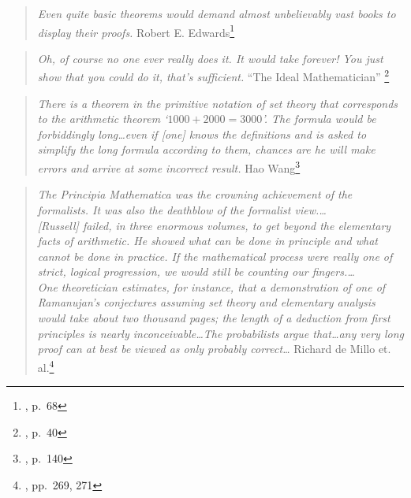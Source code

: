 \begin{quote}
  {\em Even quite basic theorems would demand almost unbelievably vast
  books to display their proofs.}
    \flushright\sc  Robert E. Edwards\footnote{\cite{Edwards}, p.~68}\\
\end{quote}

\begin{quote}
  {\em Oh, of course no one ever really {\em does} it.  It would take
  forever!  You just show that you could do it, that's sufficient.}
    \flushright\sc  ``The Ideal Mathematician''
    \footnote{\cite{Davis},
p.~40}\\
\end{quote}

\begin{quote}
  {\em There is a theorem in the primitive notation of set theory that
  corresponds to the arithmetic theorem `$1000+2000=3000$'.  The formula
  would be forbiddingly long\ldots even if [one] knows the definitions
  and is asked to simplify the long formula according to them, chances are
  he will make errors and arrive at some incorrect result.}
    \flushright\sc  Hao Wang\footnote{\cite{Wang}, p.~140}\\
\end{quote}

\vspace{-0.5em}

\begin{quote}
  {\em The {\em Principia Mathematica} was the crowning achievement of the
  formalists.  It was also the deathblow of the formalist view.\ldots\\
  {[Rus\-sell]} failed, in three enormous volumes, to get beyond the elementary
  facts of arithmetic.  He showed what can be done in principle and what
  cannot be done in practice.  If the mathematical process were really
  one of strict, logical progression, we would still be counting our
  fingers.\ldots\\
  One theoretician estimates, for instance, that a demonstration of one of
  Ramanujan's conjectures assuming set theory and elementary analysis would
  take about two thousand pages; the length of a deduction from first principles
  is nearly in\-con\-ceiv\-a\-ble\ldots The probabilists argue that\ldots any
  very long proof can at best be viewed as only probably correct\ldots}
  \flushright\sc Richard de Millo et. al.\footnote{\cite{deMillo}, pp.~269,
  271}\\
\end{quote}

